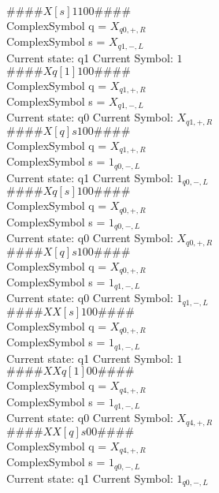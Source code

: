\documentclass[10pt, a4paper]{article}
\begin{document}
$\# \#\# \# X [ s ] 1 1 0 0 \# \# \# \# $ \\
ComplexSymbol q = $X_{q0,+,R}$ \\
ComplexSymbol s = $X_{q1,-,L}$ \\ 
 \medskip
Current state: q1	 Current Symbol: 	 $1$\\
$\# \#\# \# X q [ 1 ] 1 0 0 \# \# \# \# $ \\
ComplexSymbol q = $X_{q1,+,R}$ \\
ComplexSymbol s = $X_{q1,-,L}$ \\ 
 \medskip
Current state: q0	 Current Symbol: 	 $X_{q1,+,R}$\\
$\# \#\# \# X [ q ] s 1 0 0 \# \# \# \# $ \\
ComplexSymbol q = $X_{q1,+,R}$ \\
ComplexSymbol s = $1_{q0,-,L}$ \\ 
 \medskip
Current state: q1	 Current Symbol: 	 $1_{q0,-,L}$\\
$\# \#\# \# X q [ s ] 1 0 0 \# \# \# \# $ \\
ComplexSymbol q = $X_{q0,+,R}$ \\
ComplexSymbol s = $1_{q0,-,L}$ \\ 
 \medskip
Current state: q0	 Current Symbol: 	 $X_{q0,+,R}$\\
$\# \#\# \# X [ q ] s 1 0 0 \# \# \# \# $ \\
ComplexSymbol q = $X_{q0,+,R}$ \\
ComplexSymbol s = $1_{q1,-,L}$ \\ 
 \medskip
Current state: q0	 Current Symbol: 	 $1_{q1,-,L}$\\
$\# \#\# \# X X [ s ] 1 0 0 \# \# \# \# $ \\
ComplexSymbol q = $X_{q0,+,R}$ \\
ComplexSymbol s = $1_{q1,-,L}$ \\ 
 \medskip
Current state: q1	 Current Symbol: 	 $1$\\
$\# \#\# \# X X q [ 1 ] 0 0 \# \# \# \# $ \\
ComplexSymbol q = $X_{q4,+,R}$ \\
ComplexSymbol s = $1_{q1,-,L}$ \\ 
 \medskip
Current state: q0	 Current Symbol: 	 $X_{q4,+,R}$\\
$\# \#\# \# X X [ q ] s 0 0 \# \# \# \# $ \\
ComplexSymbol q = $X_{q4,+,R}$ \\
ComplexSymbol s = $1_{q0,-,L}$ \\ 
 \medskip
Current state: q1	 Current Symbol: 	 $1_{q0,-,L}$\\
\end{document}
